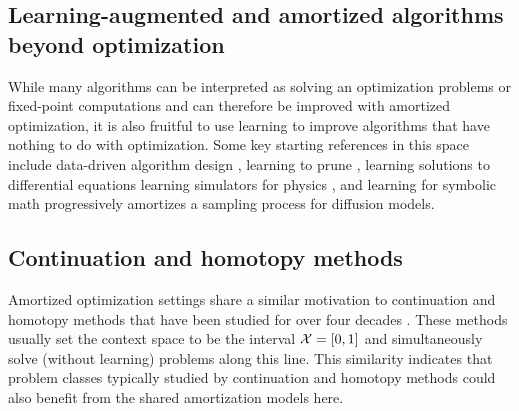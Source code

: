 \documentclass[twoside,11pt]{article}
\begin{document}
\subsection{Learning-augmented and amortized algorithms beyond optimization}
While many algorithms can be interpreted as solving an
optimization problems or fixed-point computations and
can therefore be improved with amortized optimization,
it is also fruitful to use learning to improve
algorithms that have nothing to do with optimization.
Some key starting references in this space include
data-driven algorithm design \citep{balcan2020data},
learning to prune \citep{alabi2019learning},
learning solutions to differential equations
\citep{li2020fourier,poli2020hypersolvers,karniadakis2021physics,kovachki2021universal,chen2021solving,blechschmidt2021three,marwah2021parametric,berto2021neural}
learning simulators for physics \citep{grzeszczuk1998neuroanimator,ladicky2015data,he2019learning,sanchez2020learning,wiewel2019latent,usman2021machine,vinuesa2021potential},
and learning for symbolic math
\citep{lample2019deep,charton2021linear,charton2021deep,drori2021neural,dascoli2022deep}
\citet{salimans2022progressive} progressively amortizes a
sampling process for diffusion models.

\subsection{Continuation and homotopy methods}
Amortized optimization settings share a similar motivation to
continuation and homotopy methods that have been studied for
over four decades
\citep{richter1983continuation,watson1989modern,allgower2012numerical}.
These methods usually set the context space to be the
interval ${\mathcal{X}}=[0,1]$ and simultaneously solve (without learning)
problems along this line.
This similarity indicates that problem classes typically
studied by continuation and homotopy methods could also benefit
from the shared amortization models here.


{\footnotesize}
\end{document}
